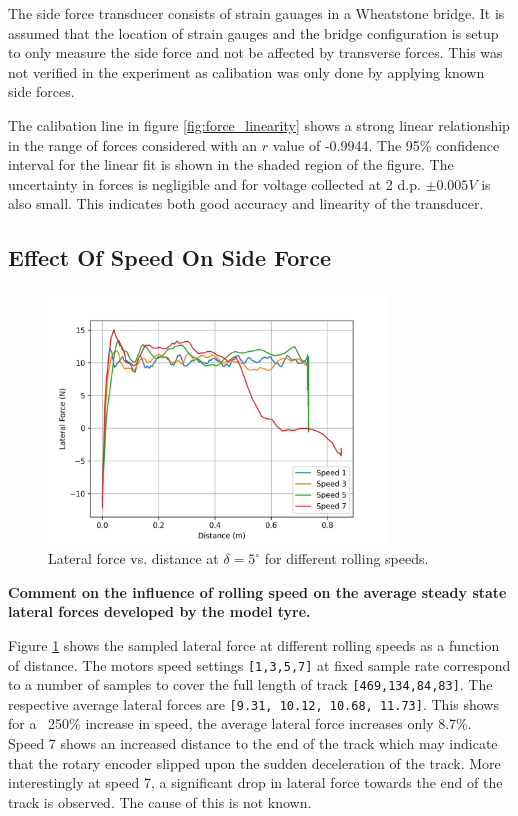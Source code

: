 \documentclass{article}
\begin{document}
The side force transducer consists of strain gauages in a Wheatstone bridge.
It is assumed that the location of strain gauges and the bridge configuration is setup to only measure the side force and not be affected by transverse forces.
This was not verified in the experiment as calibation was only done by applying known side forces.

The calibation line in figure \ref{fig:force_linearity} shows a strong linear relationship in the range of forces considered with an $r$ value of -0.9944.
The 95\% confidence interval for the linear fit is shown in the shaded region of the figure.
The uncertainty in forces is negligible and for voltage collected at 2 d.p. $\pm 0.005 V$ is also small.
This indicates both good accuracy and linearity of the transducer.

\subsection{\textbf{Effect Of Speed On Side Force}}

\begin{figure}[H]
    \centering
    \includegraphics[width=0.8\textwidth]{4.2/force_distances.png}
    \caption{Lateral force vs. distance at $\delta = 5^\circ$ for different rolling speeds.}
    \label{fig:lateral_force_distance_speed}
\end{figure}

\begin{center}
    \textbf{Comment on the influence of rolling speed on the average steady state lateral forces
    developed by the model tyre.}
\end{center}

Figure \ref{fig:lateral_force_distance_speed} shows the sampled lateral force at different rolling speeds as a function of distance.
The motors speed settings \texttt{[1,3,5,7]} at fixed sample rate correspond to a number of samples to cover the full length of track \texttt{[469,134,84,83]}.
The respective average lateral forces are \texttt{[9.31, 10.12, 10.68, 11.73]}.
This shows for a ~250\% increase in speed, the average lateral force increases only 8.7\%.
Speed 7 shows an increased distance to the end of the track which may indicate that the rotary encoder slipped upon the sudden deceleration of the track.
More interestingly at speed 7, a significant drop in lateral force towards the end of the track is observed.
The cause of this is not known.
\end{document}
